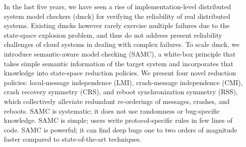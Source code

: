 In the last five years, we have seen a rise of implementation-level
distributed system model checkers (dmck) for verifying the reliability
of real distributed systems.  Existing dmcks however rarely exercise
multiple failures due to the state-space explosion problem, and thus
do not address present reliability challenges of cloud systems in
dealing with complex failures.  To scale dmck, we introduce
semantic-aware model checking (SAMC), a white-box principle that takes
simple semantic information of the target system and incorporates that
knowledge into state-space reduction policies.  We present four novel
reduction policies: local-message independence (LMI), crash-message
independence (CMI), crash recovery symmetry (CRS), and reboot
synchronization symmetry (RSS), which collectively alleviate redundant
re-orderings of messages, crashes, and reboots.  SAMC is systematic;
it does not use randomness or bug-specific knowledge.  SAMC is simple;
users write protocol-specific rules in few lines of code.  SAMC is
powerful; it can find deep bugs one to two orders of magnitude faster
compared to state-of-the-art techniques.

